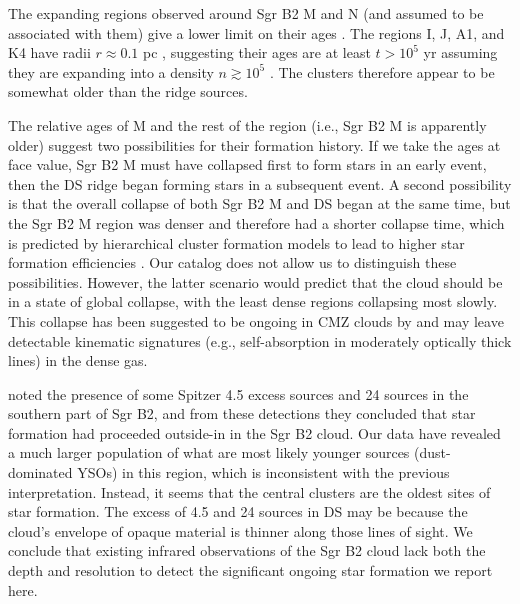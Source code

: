 \documentclass[twocolumn]{aastex61}
\begin{document}
The expanding \hii regions observed around Sgr B2 M and N (and assumed to be
associated with them) give a lower limit on their ages \citep[assuming steady
expansion, which may not be a correct model;][]{Peters2010b,De-Pree2014a}.  The
\hii regions I, J, A1, and K4 have radii $r\approx0.1$ pc \citep{Gaume1995a},
suggesting their ages are at least $t>10^5$ yr assuming they are expanding into
a density $n\gtrsim10^5$ \percc \citep{De-Pree1995a,Schmiedeke2016a}.  The
clusters therefore appear to be somewhat older than the ridge sources.


The relative ages of M and the rest of the region (i.e., Sgr B2 M is apparently
older) suggest two possibilities for their formation history.  If we take the
ages at face value, Sgr B2 M must have collapsed first to form stars in an
early event, then the DS ridge began forming stars in a
subsequent event.  A second possibility is that the overall collapse of both Sgr B2
M and DS began at the same time, but the Sgr B2 M region was denser and
therefore had a shorter collapse time, which is predicted by hierarchical
cluster formation models to lead to higher star formation efficiencies
\citep{Kruijssen2012a}.  Our catalog does not allow us to distinguish these
possibilities.  However, the latter scenario would predict that the cloud
should be in a state of global collapse, with the least dense regions
collapsing most slowly.  This collapse has been suggested to be ongoing in CMZ
clouds by \citet{Walker2015a,Walker2016a} and may leave detectable kinematic
signatures (e.g., self-absorption in moderately optically thick lines) in the
dense gas.


\citet{Yusef-Zadeh2009a} noted the presence of some Spitzer 4.5 \um excess
sources and 24 \um sources in the southern part of Sgr B2, and from these
detections they concluded that star formation had proceeded outside-in in the Sgr B2
cloud.  Our data have revealed a much larger population of what are most likely
younger sources (dust-dominated YSOs) in this region, which is
inconsistent with the previous interpretation.  Instead, it seems that the
central clusters are the oldest sites of star formation.  The excess of 4.5
and 24 \um sources in DS may be because the cloud's envelope of opaque material
is thinner along those lines of sight.  We conclude that existing infrared
observations of the Sgr B2 cloud lack both the depth and resolution to detect
the significant ongoing star formation we report here.
\end{document}
